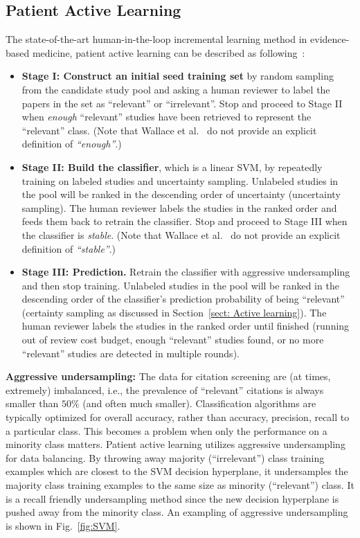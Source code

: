 \documentclass{svjour3}
\theoremstyle{break}
\begin{document}
\subsection{Patient Active Learning}
\label{sect: Patient Active Learning}

The state-of-the-art human-in-the-loop incremental learning method in evidence-based medicine, patient active learning can be described as following~\cite{wallace2010semi}:

\begin{itemize}

\item
{\bf Stage I: Construct an initial seed training set} by random sampling from the candidate study pool and asking a human reviewer to label the papers in the set as ``relevant'' or ``irrelevant''. Stop and proceed to Stage II when \textit{enough} ``relevant'' studies have been retrieved to represent the ``relevant'' class. (Note that Wallace et al.~\cite{wallace2010semi} do not provide an explicit definition of \textit{``enough''}.)

\item
{\bf Stage II: Build the classifier}, which is a linear SVM, by repeatedly training on labeled studies and uncertainty sampling. Unlabeled studies in the pool will be ranked in the descending order of uncertainty (uncertainty sampling). The human reviewer labels the studies in the ranked order and feeds them back to retrain the classifier. Stop and proceed to Stage III when the classifier is \textit{stable}. (Note that Wallace et al.~\cite{wallace2010semi} do not provide an explicit definition of \textit{``stable''}.)

\item
{\bf Stage III: Prediction.} Retrain the classifier with aggressive undersampling and then stop training. Unlabeled studies in the pool will be ranked in the descending order of the classifier's prediction probability of being ``relevant'' (certainty sampling as discussed in Section~\ref{sect: Active learning}). The human reviewer labels the studies in the ranked order until finished (running out of review cost budget, enough ``relevant'' studies found, or no more ``relevant'' studies are detected in multiple rounds).

\end{itemize}

{\bf Aggressive undersampling: }The data for citation screening are (at times, extremely) imbalanced, i.e., the prevalence of ``relevant'' citations is always smaller than $50\%$ (and often much smaller). Classification algorithms are typically optimized for overall accuracy, rather than accuracy, precision, recall to a particular class. This becomes a problem when only the performance on a minority class matters. Patient active learning utilizes aggressive undersampling for data balancing. By throwing away majority (``irrelevant'') class training examples which are closest to the SVM decision hyperplane, it undersamples the majority class training examples to the same size as minority (``relevant'') class. It is a recall friendly undersampling method since the new decision hyperplane is pushed away from the minority class. An exampling of aggressive undersampling is shown in Fig.~\ref{fig:SVM}.
\end{document}
